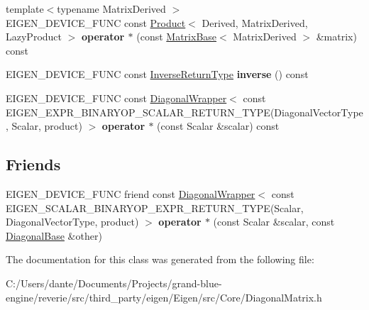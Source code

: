 \begin{DoxyCompactItemize}
\mbox{\label{class_eigen_1_1_diagonal_base_acba800343afc1840f27f03a6c54296ee}} 
{\footnotesize template$<$typename Matrix\+Derived $>$ }\\E\+I\+G\+E\+N\+\_\+\+D\+E\+V\+I\+C\+E\+\_\+\+F\+U\+NC const \mbox{\hyperlink{class_eigen_1_1_product}{Product}}$<$ Derived, Matrix\+Derived, Lazy\+Product $>$ {\bfseries operator $\ast$} (const \mbox{\hyperlink{class_eigen_1_1_matrix_base}{Matrix\+Base}}$<$ Matrix\+Derived $>$ \&matrix) const
\item 
\mbox{\label{class_eigen_1_1_diagonal_base_a608e40d7fc3d4effb3851e77d76f586b}} 
E\+I\+G\+E\+N\+\_\+\+D\+E\+V\+I\+C\+E\+\_\+\+F\+U\+NC const \mbox{\hyperlink{class_eigen_1_1_diagonal_wrapper}{Inverse\+Return\+Type}} {\bfseries inverse} () const
\item 
\mbox{\label{class_eigen_1_1_diagonal_base_a816e02a96458202a3423954df0a601ce}} 
E\+I\+G\+E\+N\+\_\+\+D\+E\+V\+I\+C\+E\+\_\+\+F\+U\+NC const \mbox{\hyperlink{class_eigen_1_1_diagonal_wrapper}{Diagonal\+Wrapper}}$<$ const E\+I\+G\+E\+N\+\_\+\+E\+X\+P\+R\+\_\+\+B\+I\+N\+A\+R\+Y\+O\+P\+\_\+\+S\+C\+A\+L\+A\+R\+\_\+\+R\+E\+T\+U\+R\+N\+\_\+\+T\+Y\+PE(Diagonal\+Vector\+Type, Scalar, product) $>$ {\bfseries operator $\ast$} (const Scalar \&scalar) const
\end{DoxyCompactItemize}
\subsection*{Friends}
\begin{DoxyCompactItemize}
\item 
\mbox{\label{class_eigen_1_1_diagonal_base_ae1653cf01bf4b97c915c493461e6c9be}} 
E\+I\+G\+E\+N\+\_\+\+D\+E\+V\+I\+C\+E\+\_\+\+F\+U\+NC friend const \mbox{\hyperlink{class_eigen_1_1_diagonal_wrapper}{Diagonal\+Wrapper}}$<$ const E\+I\+G\+E\+N\+\_\+\+S\+C\+A\+L\+A\+R\+\_\+\+B\+I\+N\+A\+R\+Y\+O\+P\+\_\+\+E\+X\+P\+R\+\_\+\+R\+E\+T\+U\+R\+N\+\_\+\+T\+Y\+PE(Scalar, Diagonal\+Vector\+Type, product) $>$ {\bfseries operator $\ast$} (const Scalar \&scalar, const \mbox{\hyperlink{class_eigen_1_1_diagonal_base}{Diagonal\+Base}} \&other)
\end{DoxyCompactItemize}


The documentation for this class was generated from the following file\+:\begin{DoxyCompactItemize}
\item 
C\+:/\+Users/dante/\+Documents/\+Projects/grand-\/blue-\/engine/reverie/src/third\+\_\+party/eigen/\+Eigen/src/\+Core/Diagonal\+Matrix.\+h\end{DoxyCompactItemize}
